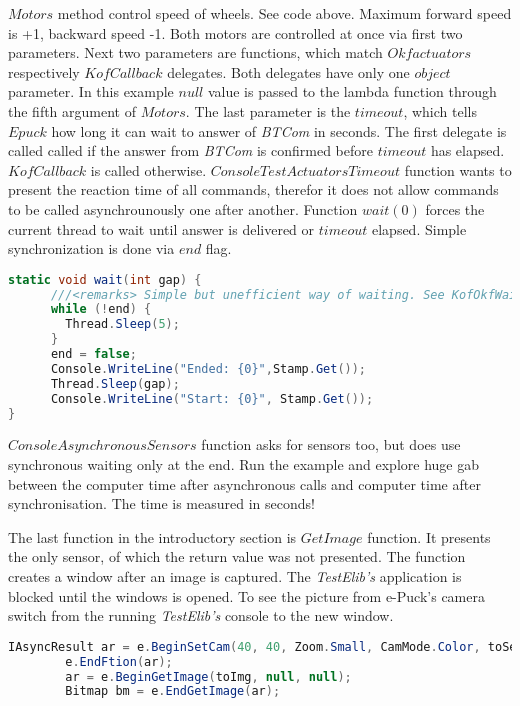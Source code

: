 	$Motors$ method control speed of wheels. See code above. Maximum forward speed is +1, backward speed -1. 
	Both motors are controlled at once via first two parameters.
	Next two parameters are functions, which match $Okfactuators$ respectively $KofCallback$ delegates. 
	Both delegates have only one $object$ parameter. In this example $null$ value is passed
	to the lambda function through the fifth argument of $Motors$. The last parameter is the $timeout$, 
	which tells $Epuck$ how long it can wait to answer of {\it BTCom} in seconds.
	The first delegate is called called if the answer from {\it BTCom} is confirmed before $timeout$ has elapsed. 
	$KofCallback$ is called otherwise.
	$ConsoleTestActuatorsTimeout$ function wants to present the reaction time of all commands, 
	therefor it does not allow commands to be called asynchrounously one after another.
	Function $wait(0)$ forces the current thread to wait until answer is delivered
	or $timeout$ elapsed. Simple synchronization is done via $end$ flag.
\begin{lstlisting}[language=cs]
static void wait(int gap) {
      ///<remarks> Simple but unefficient way of waiting. See KofOkfWaiting(..) in Behaviour for usage of EventWaitHandle.</remarks>
      while (!end) { 
        Thread.Sleep(5); 
      } 
      end = false; 
      Console.WriteLine("Ended: {0}",Stamp.Get());
      Thread.Sleep(gap);
      Console.WriteLine("Start: {0}", Stamp.Get());
}
\end{lstlisting}

	$ConsoleAsynchronousSensors$ function asks for sensors too, but does use synchronous waiting only at the end. Run the example and explore huge gab
	between the computer time after asynchronous calls and computer time after synchronisation. 
	The time is measured in seconds!
	
	The last function in the introductory section is $GetImage$ function. 
	It presents the only sensor, of which the return value was not presented.
	The function creates a window after an image is captured. 
	The {\it TestElib's} application is blocked until the windows is opened. To see the picture from
	e-Puck's camera switch from the running {\it TestElib's} console to the new window.


\begin{lstlisting}[language=cs]
	IAsyncResult ar = e.BeginSetCam(40, 40, Zoom.Small, CamMode.Color, toSetCam, null, null);
        e.EndFtion(ar);
        ar = e.BeginGetImage(toImg, null, null);
        Bitmap bm = e.EndGetImage(ar);	
\end{lstlisting}


